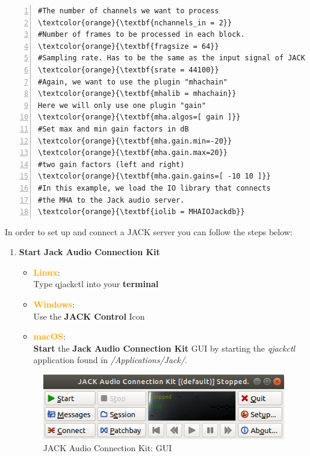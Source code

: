 \documentclass[11pt,a4paper,twoside]{article}
\newcommand{\+}{\discretionary{\mbox{\scriptsize$\hookleftarrow$}}{}{}}
\begin{document}
{{\begin{Verbatim}[frame=single,numbers=left,commandchars=\\\{\}]
#The number of channels we want to process
\textcolor{orange}{\textbf{nchannels_in = 2}}
#Number of frames to be processed in each block.
\textcolor{orange}{\textbf{fragsize = 64}}
#Sampling rate. Has to be the same as the input signal of JACK
\textcolor{orange}{\textbf{srate = 44100}}
#Again, we want to use the plugin "mhachain"
\textcolor{orange}{\textbf{mhalib = mhachain}}
Here we will only use one plugin "gain"
\textcolor{orange}{\textbf{mha.algos=[ gain ]}}
#Set max and min gain factors in dB
\textcolor{orange}{\textbf{mha.gain.min=-20}}
\textcolor{orange}{\textbf{mha.gain.max=20}}
#two gain factors (left and right)
\textcolor{orange}{\textbf{mha.gain.gains=[ -10 10 ]}}
#In this example, we load the IO library that connects
#the MHA to the Jack audio server.
\textcolor{orange}{\textbf{iolib = MHAIOJackdb}}
\end{Verbatim} 

In order to set up and connect a JACK server you can follow the steps below:

\begin{enumerate}
    \item \textbf{Start Jack Audio Connection Kit} 
    
    \begin{itemize}
\item \textcolor{orange}{\textbf{Linux}}: \\ Type {\ttfamily qjackctl} into your \textbf{terminal} 
\item \textcolor{orange}{\textbf{Windows}}: \\ Use the \textbf{JACK Control} Icon
\item \textcolor{orange}{\textbf{macOS}}: \\ \textbf{Start} the \textbf{Jack Audio Connection Kit} GUI by starting the \textit{qjackctl} application found in \textit{/Applications/Jack/}.
\end{itemize}

\begin{figure}[H]
\centering
\includegraphics[scale=0.4]{jack_gui.png}
\caption{JACK Audio Connection Kit: GUI}
\end{figure}
      

\end{enumerate}}}
\end{document}

